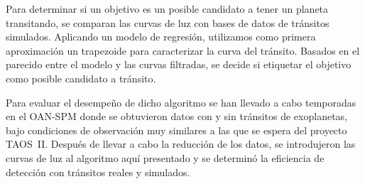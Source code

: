 Para determinar si un objetivo es un posible candidato a tener un planeta transitando, se comparan las curvas de luz con bases de datos de tránsitos simulados. Aplicando un modelo de regresión, utilizamos como primera aproximación un trapezoide para caracterizar la curva del tránsito. Basados en el parecido entre el modelo y las curvas filtradas, se decide si etiquetar el objetivo como posible candidato a tránsito.

Para evaluar el desempeño de dicho algoritmo se han llevado a cabo temporadas en el OAN-SPM donde se obtuvieron datos con y sin tránsitos de exoplanetas, bajo condiciones de observación muy similares a las que se espera del proyecto TAOS~II. Después de llevar a cabo la reducción de los datos, se introdujeron las curvas de luz al algoritmo aquí presentado y se determinó la eficiencia de detección con tránsitos reales y simulados.
